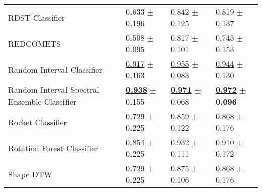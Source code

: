 \begin{tabular}{llll}
RDST Classifier & \textcolor[rgb]{0.6719665272,0.3280334728,0}{0.633} $\pm$ \textcolor[rgb]{0.7210386498,0.2789613502,0}{0.196} & \textcolor[rgb]{0.7748815166,0.2251184834,0}{0.842} $\pm$ \textcolor[rgb]{0.6660804012,0.3339195988,0}{0.125} & \textcolor[rgb]{0.6111111111,0.3888888889,0}{0.819} $\pm$ \textcolor[rgb]{0.3783535423,0.5000000000,0}{0.137} \\
REDCOMETS & \textcolor[rgb]{0.9497907950,0.0502092050,0}{0.508} $\pm$ \textcolor[rgb]{0.2201204470,0.5000000000,0}{0.095} & \textcolor[rgb]{0.9241706161,0.0758293839,0}{0.817} $\pm$ \textcolor[rgb]{0.3941798975,0.5000000000,0}{0.101} & \textcolor[rgb]{0.9166666667,0.0833333333,0}{0.743} $\pm$ \textcolor[rgb]{0.5255758785,0.4744241215,0}{0.153} \\
Random Interval Classifier & \underline{\textcolor[rgb]{0.0460251046,0.5000000000,0}{0.917}} $\pm$ \textcolor[rgb]{0.5577723962,0.4422276038,0}{0.163} & \underline{\textcolor[rgb]{0.0995260664,0.5000000000,0}{0.955}} $\pm$ \textcolor[rgb]{0.1853514393,0.5000000000,0}{0.083} & \underline{\textcolor[rgb]{0.1111111111,0.5000000000,0}{0.944}} $\pm$ \textcolor[rgb]{0.3121982484,0.5000000000,0}{0.130} \\
Random Interval Spectral Ensemble Classifier & \underline{\textbf{\textcolor[rgb]{0.0000000000,0.5000000000,0}{0.938}}} $\pm$ \textcolor[rgb]{0.5209154293,0.4790845707,0}{0.155} & \underline{\textbf{\textcolor[rgb]{0.0000000000,0.5000000000,0}{0.971}}} $\pm$ \textcolor[rgb]{0.0113491881,0.5000000000,0}{0.068} & \underline{\textbf{\textcolor[rgb]{0.0000000000,0.5000000000,0}{0.972}}} $\pm$ \textbf{\textcolor[rgb]{0.0000000000,0.5000000000,0}{0.096}} \\
Rocket Classifier & \textcolor[rgb]{0.4602510460,0.5000000000,0}{0.729} $\pm$ \textcolor[rgb]{0.8661764807,0.1338235193,0}{0.225} & \textcolor[rgb]{0.6729857820,0.3270142180,0}{0.859} $\pm$ \textcolor[rgb]{0.6321445607,0.3678554393,0}{0.122} & \textcolor[rgb]{0.4166666667,0.5000000000,0}{0.868} $\pm$ \textcolor[rgb]{0.7404054892,0.2595945108,0}{0.176} \\
Rotation Forest Classifier & \textcolor[rgb]{0.1841004184,0.5000000000,0}{0.854} $\pm$ \textcolor[rgb]{0.8661764807,0.1338235193,0}{0.225} & \underline{\textcolor[rgb]{0.2369668246,0.5000000000,0}{0.932}} $\pm$ \textcolor[rgb]{0.5075844655,0.4924155345,0}{0.111} & \underline{\textcolor[rgb]{0.2500000000,0.5000000000,0}{0.910}} $\pm$ \textcolor[rgb]{0.7066015512,0.2933984488,0}{0.172} \\
Shape DTW & \textcolor[rgb]{0.4602510460,0.5000000000,0}{0.729} $\pm$ \textcolor[rgb]{0.8661764807,0.1338235193,0}{0.225} & \textcolor[rgb]{0.5781990521,0.4218009479,0}{0.875} $\pm$ \textcolor[rgb]{0.4502989485,0.5000000000,0}{0.106} & \textcolor[rgb]{0.4166666667,0.5000000000,0}{0.868} $\pm$ \textcolor[rgb]{0.7404054892,0.2595945108,0}{0.176} \\

\end{tabular}

